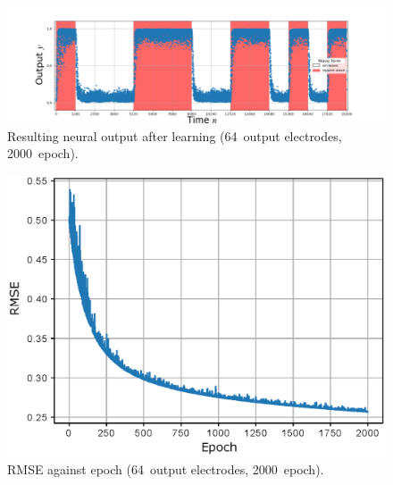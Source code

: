 \documentclass[a4j, twocolumn]{jsarticle}
\begin{document}
\begin{figure}
\centering
\includegraphics[width=1\hsize]{./figures/b128_e2000_eta30_nn64_r2.png} 
\caption{Resulting neural output after learning (64~output electrodes, 2000~epoch).}
\label{fig:result64}
\end{figure}

\begin{figure}
\centering
\includegraphics[width=1\hsize]{./figures/rmse_curvesinsqr128_32i_l_hilsinsqr128_32i_l2_hil_num_neuron64_ramdomselected_timesequence_epoch2000_batchsize128_mask10_eta30_transition0_loopnum9_r} 
\caption{RMSE against epoch (64~output electrodes, 2000~epoch).}
\label{fig:lc64}
\end{figure}
\end{document}

